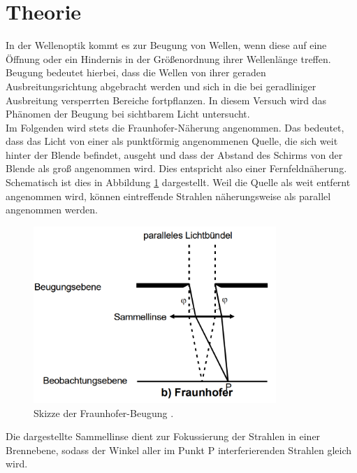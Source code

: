 \section{Theorie}
\label{sec:Theorie}
In der Wellenoptik kommt es zur Beugung von Wellen, wenn diese auf eine Öffnung oder
ein Hindernis in der Größenordnung ihrer Wellenlänge treffen. Beugung bedeutet hierbei,
dass die Wellen von ihrer geraden Ausbreitungsrichtung abgebracht werden und sich in
die bei geradliniger Ausbreitung versperrten Bereiche fortpflanzen. In diesem Versuch
wird das Phänomen der Beugung bei sichtbarem Licht untersucht. \\
Im Folgenden wird stets die Fraunhofer-Näherung angenommen. Das bedeutet, dass das Licht
von einer als punktförmig angenommenen Quelle, die sich weit hinter der Blende befindet,
ausgeht und dass der Abstand des Schirms von der Blende als groß angenommen wird. Dies
entspricht also einer Fernfeldnäherung. Schematisch ist dies in Abbildung \ref{fig:fraunhofer}
dargestellt. Weil die Quelle als weit entfernt angenommen wird, können eintreffende
Strahlen näherungsweise als parallel angenommen werden.

\begin{figure}
  \centering
  \includegraphics[width=260pt]{data/fraunhofer.png}
  \caption{Skizze der Fraunhofer-Beugung \cite{Versuchsanleitung}.}
  \label{fig:fraunhofer}
\end{figure}

Die dargestellte Sammellinse dient zur Fokussierung der Strahlen in einer Brennebene,
sodass der Winkel aller im Punkt P interferierenden Strahlen gleich wird.



